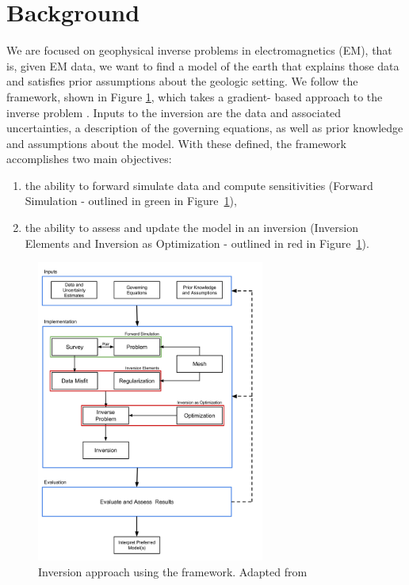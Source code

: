 \section{Background}
\label{sec:Background}

We are focused on geophysical inverse problems in electromagnetics (EM), that
is, given EM data, we want to find a model of the earth that explains those
data and satisfies prior assumptions about the geologic setting. We follow the
\SimPEG framework, shown in Figure \ref{fig:SimPEG}, which takes a gradient-
based approach to the inverse problem \citep{Cockett2015}. Inputs to the
inversion are the data and associated uncertainties, a description of the
governing equations, as well as prior knowledge and assumptions about the
model. With these defined, the \SimPEG framework accomplishes two main
objectives:
\begin{enumerate}
\item the ability to forward simulate data and compute sensitivities (Forward Simulation - outlined in green in Figure~\ref{fig:SimPEG}),
\item the ability to assess and update the model in an inversion (Inversion Elements and Inversion as Optimization - outlined in red in Figure~\ref{fig:SimPEG}).
\end{enumerate}


{%
\begin{figure}[htb!]
    \centering
    \includegraphics[width=7.5cm]{images/SimPEGInversion}
\caption{Inversion approach using the \SimPEG framework. Adapted from \cite{Cockett2015}}
\label{fig:SimPEG}
\end{figure}
}

